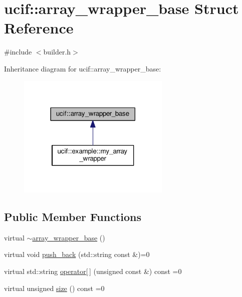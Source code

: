 \hypertarget{structucif_1_1array__wrapper__base}{\section{ucif\-:\-:array\-\_\-wrapper\-\_\-base Struct Reference}
\label{structucif_1_1array__wrapper__base}
}


{\ttfamily \#include $<$builder.\-h$>$}



Inheritance diagram for ucif\-:\-:array\-\_\-wrapper\-\_\-base\-:
\nopagebreak
\begin{figure}[H]
\begin{center}
\leavevmode
\includegraphics[width=206pt]{structucif_1_1array__wrapper__base__inherit__graph}
\end{center}
\end{figure}
\subsection*{Public Member Functions}
\begin{DoxyCompactItemize}
\item 
virtual \hyperlink{structucif_1_1array__wrapper__base_a66626bc3dff247a1c853ae1ea77be1b3}{$\sim$array\-\_\-wrapper\-\_\-base} ()
\item 
virtual void \hyperlink{structucif_1_1array__wrapper__base_a11a9e1c2bef2ecf88f02450c1dab229d}{push\-\_\-back} (std\-::string const \&)=0
\item 
virtual std\-::string \hyperlink{structucif_1_1array__wrapper__base_a63b4f0edcf90040a7f4155ea02f29f05}{operator\mbox{[}$\,$\mbox{]}} (unsigned const \&) const =0
\item 
virtual unsigned \hyperlink{structucif_1_1array__wrapper__base_a000b5a6968937d34dbc194dfdb667116}{size} () const =0
\end{DoxyCompactItemize}



